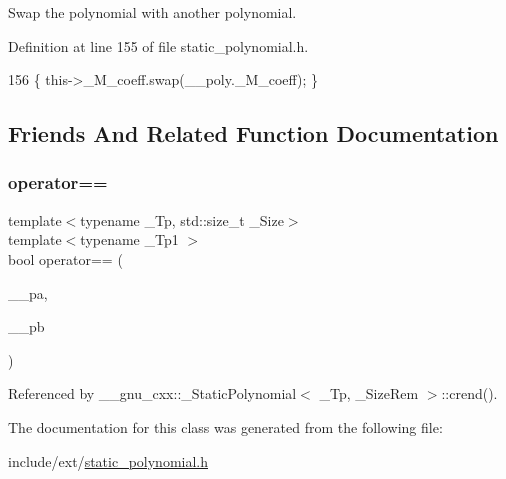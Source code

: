 Swap the polynomial with another polynomial. 

Definition at line 155 of file static\+\_\+polynomial.\+h.


\begin{DoxyCode}
156       \{ this->\_M\_coeff.swap(\_\_poly.\_M\_coeff); \}
\end{DoxyCode}


\subsection{Friends And Related Function Documentation}
\mbox{\label{class____gnu__cxx_1_1__StaticPolynomial_a851635a09c4301d11b439bfbb192df3a}} 
\subsubsection{\texorpdfstring{operator==}{operator==}}
{\footnotesize\ttfamily template$<$typename \+\_\+\+Tp, std\+::size\+\_\+t \+\_\+\+Size$>$ \\
template$<$typename \+\_\+\+Tp1 $>$ \\
bool operator== (\begin{DoxyParamCaption}\item[{const \hyperlink{class____gnu__cxx_1_1__StaticPolynomial}{\+\_\+\+Static\+Polynomial}$<$ \+\_\+\+Tp1, \+\_\+\+Size $>$ \&}]{\+\_\+\+\_\+pa,  }\item[{const \hyperlink{class____gnu__cxx_1_1__StaticPolynomial}{\+\_\+\+Static\+Polynomial}$<$ \+\_\+\+Tp1, \+\_\+\+Size $>$ \&}]{\+\_\+\+\_\+pb }\end{DoxyParamCaption})\hspace{0.3cm}{\ttfamily [friend]}}



Referenced by \+\_\+\+\_\+gnu\+\_\+cxx\+::\+\_\+\+Static\+Polynomial$<$ \+\_\+\+Tp, \+\_\+\+Size\+Rem $>$\+::crend().



The documentation for this class was generated from the following file\+:\begin{DoxyCompactItemize}
\item 
include/ext/\hyperlink{static__polynomial_8h}{static\+\_\+polynomial.\+h}\end{DoxyCompactItemize}
